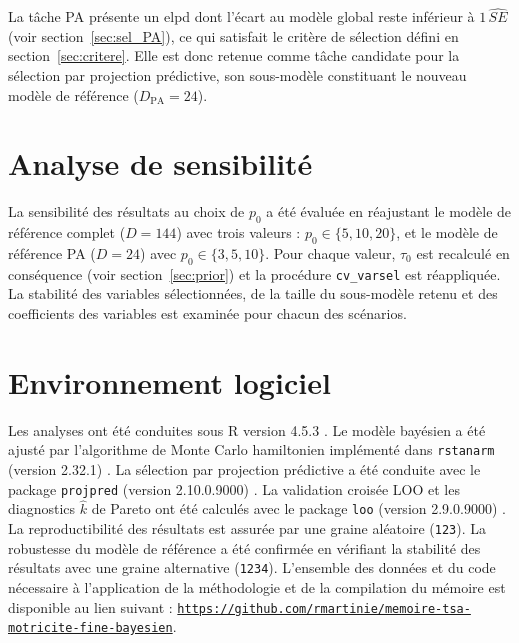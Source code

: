 \medskip 

La tâche PA présente un elpd dont l'écart au modèle global reste inférieur à $1\,\widehat{SE}$ (voir section~\ref{sec:sel_PA}), ce qui satisfait le critère de sélection défini en section~\ref{sec:critere}. Elle est donc retenue comme tâche candidate pour la sélection par projection prédictive, son sous-modèle constituant le nouveau modèle de référence ($D_\text{PA} = 24$). 


\section{Analyse de sensibilité}\label{sec:sensi}
La sensibilité des résultats au choix de $p_0$ a été évaluée en réajustant le modèle de référence complet ($D=144$) avec trois valeurs : $p_0 \in \{5, 10, 20\}$, et le modèle de référence PA ($D=24$) avec $p_0 \in \{3, 5, 10\}$. Pour chaque valeur, $\tau_0$ est recalculé en conséquence (voir section~\ref{sec:prior}) et la procédure \texttt{cv\_varsel} est réappliquée. La stabilité des variables sélectionnées, de la taille du sous-modèle retenu et des coefficients des variables est examinée pour chacun des scénarios.


\section{Environnement logiciel}
Les analyses ont été conduites sous R version 4.5.3 \parencite{R}. Le modèle bayésien a été ajusté par l'algorithme de Monte Carlo hamiltonien implémenté dans \texttt{rstanarm} (version 2.32.1) \parencite{rstanarm}. La sélection par projection prédictive a été conduite avec le package \texttt{projpred} (version 2.10.0.9000) \parencite{projpred}. La validation croisée LOO et les diagnostics $\hat{k}$ de Pareto ont été calculés avec le package \texttt{loo} (version 2.9.0.9000) \parencite{loo}. La reproductibilité des résultats est assurée par une graine aléatoire (\texttt{123}). La robustesse du modèle de référence a été confirmée en vérifiant la stabilité des résultats avec une graine alternative (\texttt{1234}). L'ensemble des données et du code nécessaire à l'application de la méthodologie et de la compilation du mémoire est disponible au lien suivant : \texttt{\url{https://github.com/rmartinie/memoire-tsa-motricite-fine-bayesien}}.

